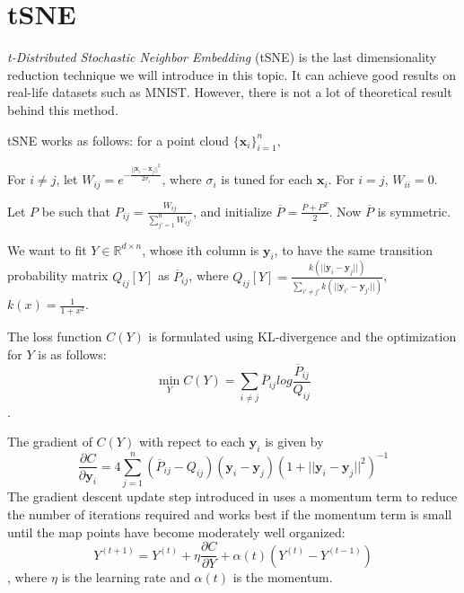 \documentclass[11pt]{article}
\theoremstyle{definition}
\begin{document}
\section{tSNE}
\textit{t-Distributed Stochastic Neighbor Embedding} (tSNE) \cite{maaten2008visualizing} is the last dimensionality reduction technique we will introduce in this topic. It can achieve good results on real-life datasets such as MNIST. However, there is not a lot of theoretical result behind this method.

tSNE works as follows: for a point cloud $\{\mathbf{x}_i\}_{i=1}^n$,
\begin{steps}
\item For $i \neq j$, let $W_{ij} = e^{-\frac{||\boldsymbol{x}_i-\boldsymbol{x}_j||^2}{2\sigma_i}}$, where $\sigma_i$ is tuned for each $\boldsymbol{x}_i$. For $i = j$, $W_{ii} = 0$.

Let $P$ be such that $P_{ij} = \frac{W_{ij}}{\sum_{j'=1}^{n}W_{ij'}}$, and initialize $\overline{P} = \frac{P+P^T}{2}$. Now $\overline{P}$ is symmetric.

\item We want to fit $Y \in \mathbb{R}^{d \times n}$, whose ith column is $\boldsymbol{y}_i$, to have the same transition probability matrix $Q_{ij}[Y]$ as $\overline{P}_{ij}$, where $Q_{ij}[Y] = \frac{k(||\boldsymbol{y}_i - \boldsymbol{y}_j||)}{\sum_{i'\neq j'} k(||\boldsymbol{y}_{i'} - \boldsymbol{y}_{j'}||)}$, $k(x) = \frac{1}{1+x^2}$.

The loss function $C(Y)$ is formulated using KL-divergence and the optimization for $Y$ is as follows:
\[\min_{Y}C(Y) = \sum_{i \neq j}\overline{P}_{ij}log\frac{\overline{P}_{ij}}{Q_{ij}}\].


The gradient of $C(Y)$ with repect to each $\boldsymbol{y}_{i }$ is given by
\[\frac{\partial C}{\partial \boldsymbol{y}_i} = 4\sum_{j=1}^{n}(\overline{P}_{ij}-Q_{ij})(\boldsymbol{y}_{i} - \boldsymbol{y}_{j}) (1+||\boldsymbol{y}_{i} - \boldsymbol{y}_{j}||^2)^{-1}\]
The gradient descent update step introduced in \cite{maaten2008visualizing} uses a momentum term to reduce the number of iterations required and works best if the momentum term is small until the map points have become moderately well organized:
\[Y^{(t+1)} = Y^{(t)} + \eta\frac{\partial C}{\partial Y} + \alpha(t)(Y^{(t)}-Y^{(t-1)})\],
where $\eta$ is the learning rate and $\alpha(t)$ is the momentum.
\end{steps}


\end{document}
